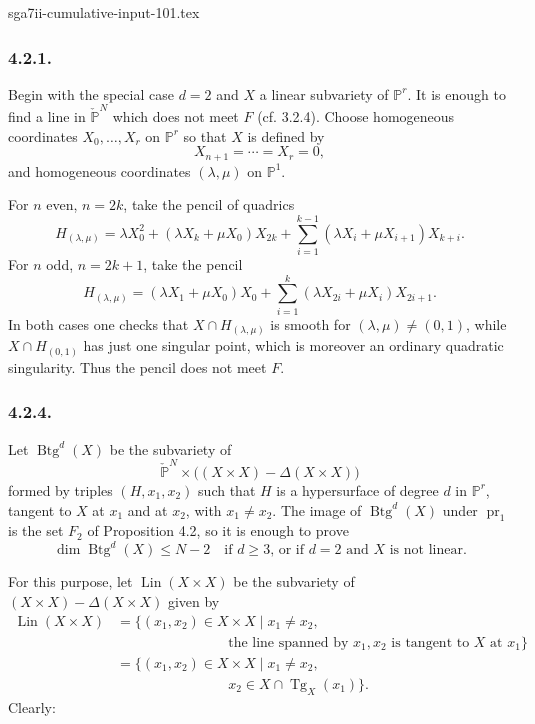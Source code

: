 \begin{filecontents*}{sga7ii-cumulative-input-101.tex}
\subsubsection*{4.2.1.}
Begin with the special case $d=2$ and $X$ a linear subvariety of
$\mathbb P^r$.  It is enough to find a line in
$\check{\mathbb P}^{N}$ which does not meet $F$ (cf. 3.2.4).  Choose
homogeneous coordinates $X_0,\ldots,X_r$ on $\mathbb P^r$ so that
$X$ is defined by
\[
X_{n+1}=\cdots=X_r=0,
\]
and homogeneous coordinates $(\lambda,\mu)$ on $\mathbb P^1$.

For $n$ even, $n=2k$, take the pencil of quadrics
\begin{equation}\tag{4.2.2}
H_{(\lambda,\mu)}
=\lambda X_0^2+(\lambda X_k+\mu X_0)X_{2k}
 +\sum_{i=1}^{k-1}(\lambda X_i+\mu X_{i+1})X_{k+i}.
\end{equation}
For $n$ odd, $n=2k+1$, take the pencil
\begin{equation}\tag{4.2.3}
H_{(\lambda,\mu)}
=(\lambda X_1+\mu X_0)X_0
 +\sum_{i=1}^{k}(\lambda X_{2i}+\mu X_i)X_{2i+1}.
\end{equation}
In both cases one checks that $X\cap H_{(\lambda,\mu)}$ is smooth for
$(\lambda,\mu)\ne(0,1)$, while $X\cap H_{(0,1)}$ has just one
singular point, which is moreover an ordinary quadratic singularity.
Thus the pencil does not meet $F$.

\subsubsection*{4.2.4.}
Let $\operatorname{Btg}^{d}(X)$ be the subvariety of
\[
\check{\mathbb P}^{N}\times
\bigl((X\times X)-\Delta(X\times X)\bigr)
\]
formed by triples $(H,x_1,x_2)$ such that $H$ is a hypersurface of
degree $d$ in $\mathbb P^r$, tangent to $X$ at $x_1$ and at $x_2$,
with $x_1\ne x_2$.  The image of $\operatorname{Btg}^{d}(X)$ under
$\operatorname{pr}_1$ is the set $F_2$ of Proposition 4.2, so it is
enough to prove
\begin{equation}\tag{4.2.5}
\dim\operatorname{Btg}^{d}(X)\leq N-2
\quad\text{if $d\geq3$, or if $d=2$ and $X$ is not linear.}
\end{equation}

For this purpose, let $\operatorname{Lin}(X\times X)$ be the
subvariety of $(X\times X)-\Delta(X\times X)$ given by
\begin{equation}\tag{4.2.6}
\begin{aligned}
\operatorname{Lin}(X\times X)
&=\bigl\{(x_1,x_2)\in X\times X\mid x_1\ne x_2,\\[-1ex]
&\hspace{8em}\text{the line spanned by $x_1,x_2$ is tangent to $X$ at $x_1$}
\bigr\}\\
&=\bigl\{(x_1,x_2)\in X\times X\mid x_1\ne x_2,\\[-1ex]
&\hspace{8em}x_2\in X\cap\operatorname{Tg}_X(x_1)\bigr\}.
\end{aligned}
\end{equation}
Clearly:


\end{filecontents*}

